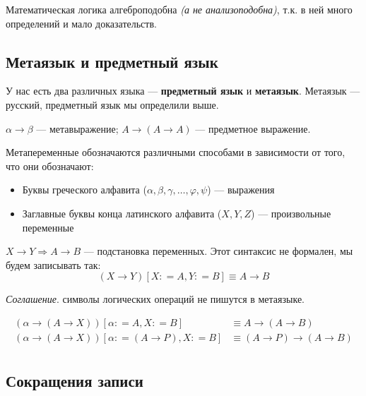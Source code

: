 \documentclass[12pt, a4paper, oneside]{book}
\begin{document}
\begin{remark}
    Математическая логика алгеброподобна \textit{(а не анализоподобна)}, т.к. в ней много определений и мало доказательств.
\end{remark}

\subsection{Метаязык и предметный язык}

У нас есть два различных языка --- \textbf{предметный язык} и \textbf{метаязык}. Метаязык --- русский, предметный язык мы определили выше.

\begin{example}
    \(\alpha \to \beta\) --- метавыражение; \(A \to (A \to A)\) --- предметное выражение.
\end{example}

\begin{obozn}
    Метапеременные обозначаются различными способами в зависимости от того, что они обозначают:
    \begin{itemize}
        \item Буквы греческого алфавита (\(\alpha, \beta, \gamma, \dots, \varphi, \psi\)) --- выражения
        \item Заглавные буквы конца латинского алфавита (\(X, Y, Z\)) --- произвольные переменные
    \end{itemize}
\end{obozn}

\begin{example}
    \(X \to Y \Rightarrow A \to B\) --- подстановка переменных. Этот синтаксис не формален, мы будем записывать так:
    \[(X \to Y)[X : = A, Y : = B]\equiv A \to B\]
\end{example}

\textit{Соглашение}. символы логических операций не пишутся в метаязыке.

\begin{example}
    \begin{align*}
        (\alpha \to (A \to X))[\alpha : = A, X : = B]         & \equiv A \to (A \to B)         \\
        (\alpha \to (A \to X))[\alpha : = (A \to P), X : = B] & \equiv (A \to P) \to (A \to B) \\
    \end{align*}
\end{example}

\subsection{Сокращения записи}
\end{document}
